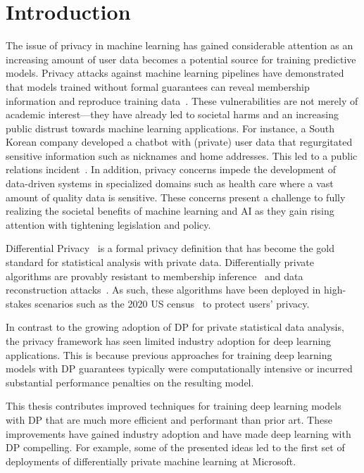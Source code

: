 \chapter{Introduction}

The issue of privacy in machine learning has gained considerable attention as an increasing amount of user data becomes a potential source for training predictive models.
Privacy attacks against machine learning pipelines have demonstrated that models trained without formal guarantees can reveal membership information and reproduce training data~\cite{shokri2017membership,carlini2021extracting}.
These vulnerabilities are not merely of academic interest---they have already led to societal harms and an increasing public distrust towards machine learning applications.
For instance, a South Korean company developed a chatbot with (private) user data that regurgitated sensitive information such as nicknames and home addresses. This led to a public relations incident~\cite{sk-chatbot}.
In addition, privacy concerns impede the development of data-driven systems in specialized domains such as health care where a vast amount of quality data is sensitive.
These concerns present a challenge to fully realizing the societal benefits of machine learning and AI as they gain rising attention with tightening legislation and policy.

Differential Privacy~\cite[DP]{dwork2014algorithmic} is a formal privacy definition that has become the gold standard for statistical analysis with private data.
Differentially private algorithms are provably resistant to membership inference~\cite{yeom2018privacy,wasserman2010statistical} and data reconstruction attacks~\cite{pmlr-v162-guo22c,hayes2023bounding}.
As such, these algorithms have been deployed in high-stakes scenarios such as the 2020 US census~\cite{us-census} to protect users' privacy.

In contrast to the growing adoption of DP for private statistical data analysis, the privacy framework has seen limited industry adoption for deep learning applications.
This is because previous approaches for training deep learning models with DP guarantees typically were computationally intensive or incurred substantial performance penalties on the resulting model.

This thesis contributes improved techniques for training deep learning models with DP that are much more efficient and performant than prior art.
These improvements have gained industry adoption and have made deep learning with DP compelling.
For example, some of the presented ideas led to the first set of deployments of differentially private machine learning at Microsoft.

